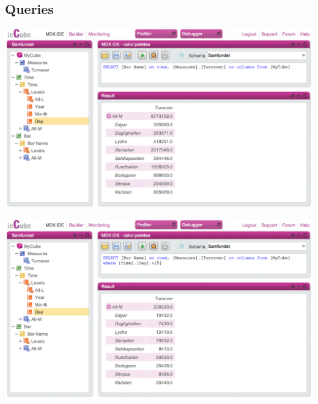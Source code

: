 \documentclass[11pt,a4paper]{article}
\begin{document}
\clearpage
\subsection{Queries}

\includegraphics[width=\textwidth]{mdx_query_1}

\vspace{2cm}
\noindent

\includegraphics[width=\textwidth]{mdx_query_2}


\end{document}
